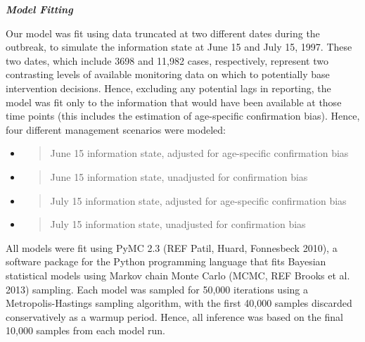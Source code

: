 \emph{\textbf{Model Fitting}}

Our model was fit using data truncated at two different dates during the
outbreak, to simulate the information state at June 15 and July 15,
1997. These two dates, which include 3698 and 11,982 cases,
respectively, represent two contrasting levels of available monitoring
data on which to potentially base intervention decisions. Hence,
excluding any potential lags in reporting, the model was fit only to the
information that would have been available at those time points (this
includes the estimation of age-specific confirmation bias). Hence, four
different management scenarios were modeled:

\begin{itemize}
\item
  \begin{quote}
  June 15 information state, adjusted for age-specific confirmation bias
  \end{quote}
\item
  \begin{quote}
  June 15 information state, unadjusted for confirmation bias
  \end{quote}
\item
  \begin{quote}
  July 15 information state, adjusted for age-specific confirmation bias
  \end{quote}
\item
  \begin{quote}
  July 15 information state, unadjusted for confirmation bias
  \end{quote}
\end{itemize}

All models were fit using PyMC 2.3 (REF Patil, Huard, Fonnesbeck 2010),
a software package for the Python programming language that fits
Bayesian statistical models using Markov chain Monte Carlo (MCMC, REF
Brooks et al. 2013) sampling. Each model was sampled for 50,000
iterations using a Metropolis-Hastings sampling algorithm, with the
first 40,000 samples discarded conservatively as a warmup period. Hence,
all inference was based on the final 10,000 samples from each model run.
